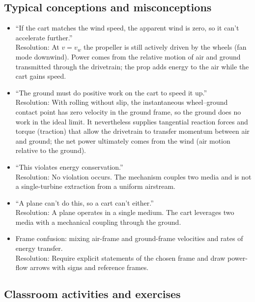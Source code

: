 \documentclass[a4paper]{article}
\begin{document}
\subsection{Typical conceptions and misconceptions}
\label{sec:misconceptions}

\begin{itemize}
\item ``If the cart matches the wind speed, the apparent wind is zero, so it can't accelerate further.''
\\Resolution: At $v=v_w$ the propeller is still actively driven by the wheels (fan mode downwind). Power comes from the relative motion of air and ground transmitted through the drivetrain; the prop adds energy to the air while the cart gains speed.

\item ``The ground must do positive work on the cart to speed it up.''
\\Resolution: With rolling without slip, the instantaneous wheel--ground contact point has zero velocity in the ground frame, so the ground does no work in the ideal limit. It nevertheless supplies tangential reaction forces and torque (traction) that allow the drivetrain to transfer momentum between air and ground; the net power ultimately comes from the wind (air motion relative to the ground).

\item ``This violates energy conservation.''
\\Resolution: No violation occurs. The mechanism couples two media and is not a single-turbine extraction from a uniform airstream.

\item ``A plane can't do this, so a cart can't either.''
\\Resolution: A plane operates in a single medium. The cart leverages two media with a mechanical coupling through the ground.

\item Frame confusion: mixing air-frame and ground-frame velocities and rates of energy transfer.
\\Resolution: Require explicit statements of the chosen frame and draw power-flow arrows with signs and reference frames.
\end{itemize}

\subsection{Classroom activities and exercises}
\end{document}
